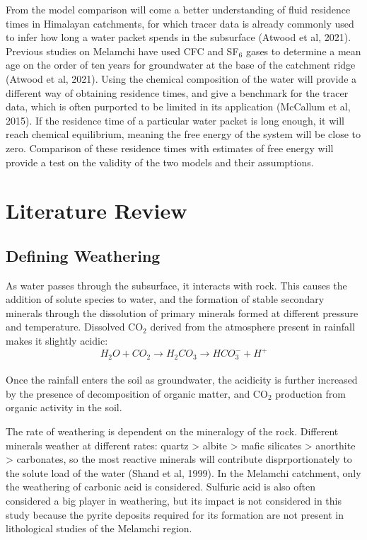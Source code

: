 \bsk

From the model comparison will come a better understanding of fluid residence times in Himalayan catchments, for which tracer data is already commonly used to infer how long a water packet spends in the subsurface (Atwood et al, 2021). Previous studies on Melamchi have used CFC and SF$_6$ gases to determine a mean age on the order of ten years for groundwater at the base of the catchment ridge (Atwood et al, 2021). Using the chemical composition of the water will provide a different way of obtaining residence times, and give a benchmark for the tracer data, which is often purported to be limited in its application (McCallum et al, 2015). If the residence time of a particular water packet is long enough, it will reach chemical equilibrium, meaning the free energy of the system will be close to zero. Comparison of these residence times with estimates of free energy will provide a test on the validity of the two models and their assumptions.


\newpage

\section{Literature Review}

\subsection{Defining Weathering}

As water passes through the subsurface, it interacts with rock. This causes the addition of solute species to water, and the formation of stable secondary minerals through the dissolution of primary minerals formed at different pressure and temperature. Dissolved CO$_2$ derived from the atmosphere present in rainfall makes it slightly acidic:\\
\begin{equation}
H_2O + CO_2 \rightarrow H_2CO_3 \rightarrow HCO_3^- + H^+
\end{equation}\\
Once the rainfall enters the soil as groundwater, the acidicity is further increased by the presence of decomposition of organic matter, and CO$_2$ production from organic activity in the soil.

\bsk

The rate of weathering is dependent on the mineralogy of the rock. Different minerals weather at different rates: quartz > albite > mafic silicates > anorthite > carbonates, so the most reactive minerals will contribute disprportionately to the solute load of the water (Shand et al, 1999). In the Melamchi catchment, only the weathering of carbonic acid is considered. Sulfuric acid is also often considered a big player in weathering, but its impact is not considered in this study because the pyrite deposits required for its formation are not present in lithological studies of the Melamchi region.

